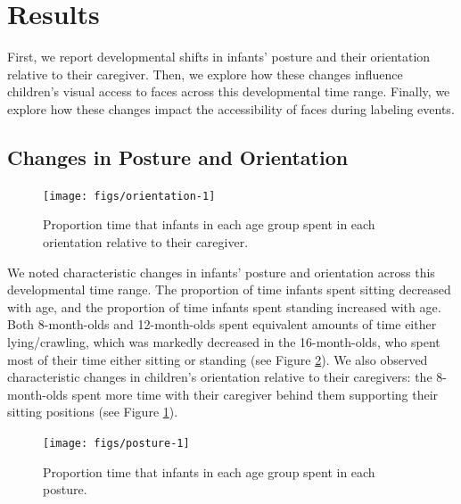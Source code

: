 \documentclass[10pt, letterpaper]{article}
\newenvironment{CodeChunk}{}{}
\begin{document}
\section{Results}\label{results}

First, we report developmental shifts in infants' posture and their
orientation relative to their caregiver. Then, we explore how these
changes influence children's visual access to faces across this
developmental time range. Finally, we explore how these changes impact
the accessibility of faces during labeling events.

\subsection{Changes in Posture and
Orientation}\label{changes-in-posture-and-orientation}

\begin{CodeChunk}
\begin{figure}[h]

{\centering \texttt{[image: figs/orientation-1]} 

}

\caption[Proportion time that infants in each age group spent in each orientation relative to their caregiver]{Proportion time that infants in each age group spent in each orientation relative to their caregiver.}\label{fig:orientation}
\end{figure}
\end{CodeChunk}

We noted characteristic changes in infants' posture and orientation
across this developmental time range. The proportion of time infants
spent sitting decreased with age, and the proportion of time infants
spent standing increased with age. Both 8-month-olds and 12-month-olds
spent equivalent amounts of time either lying/crawling, which was
markedly decreased in the 16-month-olds, who spent most of their time
either sitting or standing (see Figure \ref{fig:posture}). We also
observed characteristic changes in children's orientation relative to
their caregivers: the 8-month-olds spent more time with their caregiver
behind them supporting their sitting positions (see Figure
\ref{fig:orientation}).

\begin{CodeChunk}
\begin{figure}[h]

{\centering \texttt{[image: figs/posture-1]} 

}

\caption[Proportion time that infants in each age group spent in each posture]{Proportion time that infants in each age group spent in each posture.}\label{fig:posture}
\end{figure}
\end{CodeChunk}
\end{document}
